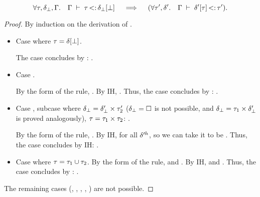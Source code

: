 \begin{lemma}\label{lem:sub-of-bot:app}
    \[
    \forall \tau, \delta_{\bot}, \Gamma.\quad 
    \Gamma\;\vdash\;\tau \operatorname{<:} \delta_{\bot}[\bot]
    \quad\implies\quad
    (\forall \tau', \delta'.\quad \Gamma\;\vdash\;\delta'[\tau] \operatorname{<:} \tau').
    \]
\end{lemma}
\begin{proof}
    By induction on the derivation of 
    \subtydflt{\ty}{\plug{\dctx_{\tybot}}\tybot}.
    \begin{itemize}
        \item Case 
            \subtydflt{\plug\dctx\tybot}{\plug{\dctx_{\tybot}}{\tybot}}
            where $\tau = \delta[\bot]$.

            The case concludes by :
            . 
        \item Case 
            \subtydflt{\plug\dctx\vany}{\plug{\dctx_{\tybot}}{\tybot}}.

            By the form of the rule, \subtydflt{\plug\dctx\tyub}{\plug{\dctx_{\tybot}}{\tybot}}.
            By IH, .
            Thus, the case concludes by : 
            .
        \item Case , subcase where
            $\delta_{\bot} = \delta'_{\bot} \times \tau'_2$
            ($\delta_{\bot} = \square$ is not possible, and
            $\delta_{\bot} = \tau_1 \times \delta'_{\bot}$
            is proved analogously),
            $\tau = \tau_1 \times \tau_2$:
            {}.

            By the form of the rule, .
            By IH,  for all $\delta'^h$,
            so we can take it to be .
            Thus, the case concludes by IH: 
            .
        \item Case 
            where $\tau = \tau_1 \cup \tau_2$.
            By the form of the rule, 
             and
            .
            By IH,  and
            .
            Thus, the case concludes by : 
            .
    \end{itemize}
    The remaining cases 
    (, , , , ) 
    are not possible.
\end{proof}

